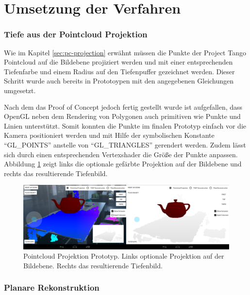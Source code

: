 \section{Umsetzung der Verfahren} \label{sec:method-implementation}

\subsubsection*{Tiefe aus der Pointcloud Projektion}

Wie im Kapitel \ref{sec:pc-projection} erwähnt müssen die Punkte der Project Tango Pointcloud auf die Bildebene projiziert werden und mit einer entsprechenden Tiefenfarbe und einem Radius auf den Tiefenpuffer gezeichnet werden. Dieser Schritt wurde auch bereits in Prototoypen mit den angegebenen Gleichungen umgesetzt. 

Nach dem das Proof of Concept jedoch fertig gestellt wurde ist aufgefallen, dass OpenGL neben dem Rendering von Polygonen auch primitiven wie Punkte und Linien unterstützt. Somit konnten die Punkte im finalen Prototyp einfach vor die Kamera positioniert werden und mit Hilfe der symbolischen Konstante \enquote{GL\_POINTS} anstelle von \enquote{GL\_TRIANGLES} gerendert werden. Zudem lässt sich durch einen entsprechenden Vertexshader die Größe der Punkte anpassen. Abbildung \ref{fig:pc-demo} zeigt links die optionale gefärbte Projektion auf der Bildebene und rechts das resultierende Tiefenbild.

\begin{figure}[h]
  \centering
	\includegraphics[width=1.0\textwidth]{content/images/implementation/pc-demo.png} 
  \caption{Pointcloud Projektion Prototyp. Links optionale Projektion auf der Bildebene. Rechts das resultierende Tiefenbild.}
  \label{fig:pc-demo}
\end{figure}



\subsubsection*{Planare Rekonstruktion}

